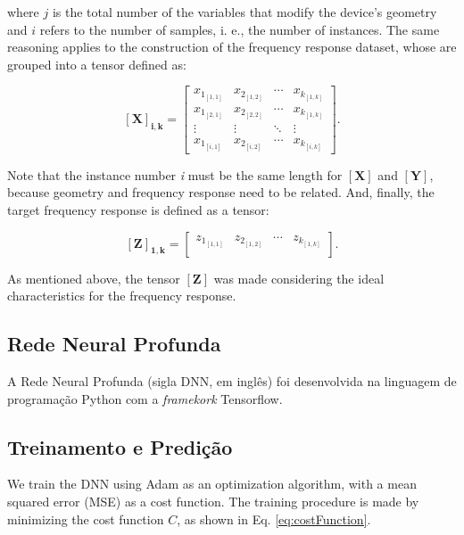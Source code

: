 \noindent
where $j$ is the total number of the variables that modify the device's geometry and $i$ refers to the number of samples, i. e., the number of instances. The same reasoning applies to the construction of the frequency response dataset, whose are grouped into a tensor defined as:

\begin{equation}
\label{eq:tensorX}
\mathbf{[X]_{i,k}} =
\begin{bmatrix}
x_{1_{[1,1]}} & x_{2_{[1,2]}} & \cdots & x_{k_{[1,k]}}\\
x_{1_{[2,1]}} & x_{2_{[2,2]}} & \cdots & x_{k_{[1,k]}}\\
\vdots  & \vdots  & \ddots & \vdots\\
x_{1_{[i,1]}} & x_{2_{[i,2]}} & \cdots & x_{k_{[i,k]}}
\end{bmatrix}.
\end{equation}

Note that the instance number \textit{i} must be the same length for $\mathbf{[X]}$ and $\mathbf{[Y]}$, because geometry and frequency response need to be related. And, finally, the target frequency response is defined as a tensor:

\begin{equation}
\label{eq:tensorZ}
\mathbf{[Z]_{1,k}} =
\begin{bmatrix}
z_{1_{[1,1]}} & z_{2_{[1,2]}} & \cdots & z_{k_{[1,k]}}\\
\end{bmatrix}.
\end{equation}

As mentioned above, the tensor $\mathbf{[Z]}$ was made considering the ideal characteristics for the frequency response.


\subsection{Rede Neural Profunda}

A Rede Neural Profunda (sigla DNN, em inglês) foi desenvolvida na linguagem de programação Python com a \textit{framekork} Tensorflow. 

\subsection{Treinamento e Predição}

We train the DNN using Adam as an optimization algorithm, with a mean squared error (MSE) as a cost function. The training procedure is made by minimizing the cost function $C$, as shown in Eq. \ref{eq:costFunction}.

